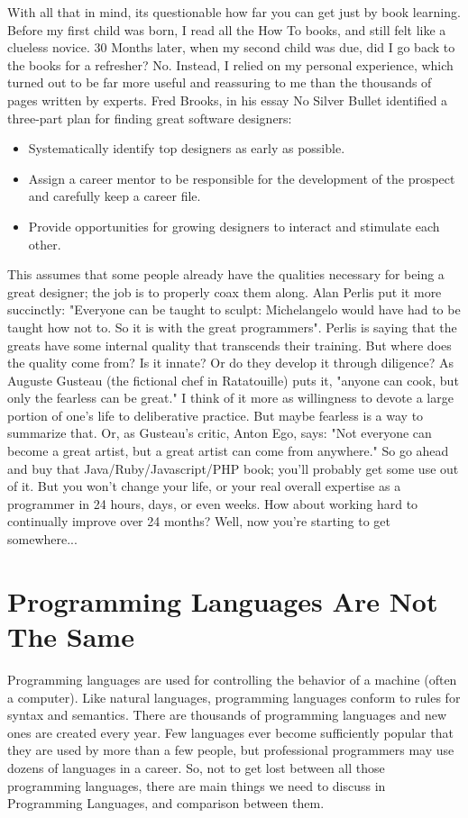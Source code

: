 \documentclass[12pt,a4paper,final,twoside,onecolumn,titlepage]{book}
\begin{document}
With all that in mind, its questionable how far you can get just by book learning. Before my first child was born, I read all the How To books, and still felt like a clueless novice. 30 Months later, when my second child was due, did I go back to the books for a refresher? No. Instead, I relied on my personal experience, which turned out to be far more useful and reassuring to me than the thousands of pages written by experts.
Fred Brooks, in his essay No Silver Bullet identified a three-part plan for finding great software designers:
\begin{itemize}
\item Systematically identify top designers as early as possible.
\item Assign a career mentor to be responsible for the development of the prospect and carefully keep a career file.
\item Provide opportunities for growing designers to interact and stimulate each other.
\end{itemize}
This assumes that some people already have the qualities necessary for being a great designer; the job is to properly coax them along. Alan Perlis put it more succinctly: "Everyone can be taught to sculpt: Michelangelo would have had to be taught how not to. So it is with the great programmers". Perlis is saying that the greats have some internal quality that transcends their training. But where does the quality come from? Is it innate? Or do they develop it through diligence? As Auguste Gusteau (the fictional chef in Ratatouille) puts it, "anyone can cook, but only the fearless can be great." I think of it more as willingness to devote a large portion of one's life to deliberative practice. But maybe fearless is a way to summarize that. Or, as Gusteau's critic, Anton Ego, says: "Not everyone can become a great artist, but a great artist can come from anywhere."
So go ahead and buy that Java/Ruby/Javascript/PHP book; you'll probably get some use out of it. But you won't change your life, or your real overall expertise as a programmer in 24 hours, days, or even weeks. How about working hard to continually improve over 24 months? Well, now you're starting to get somewhere...

\chapter{Programming Languages Are Not The Same}
Programming languages are used for controlling the behavior of a machine (often a computer). Like natural languages, programming languages conform to rules for syntax and semantics. There are thousands of programming languages and new ones are created every year. Few languages ever become sufficiently popular that they are used by more than a few people, but professional programmers may use dozens of languages in a career. So, not to get lost between all those programming languages, there are main things we need to discuss in Programming Languages, and comparison between them.
\end{document}
